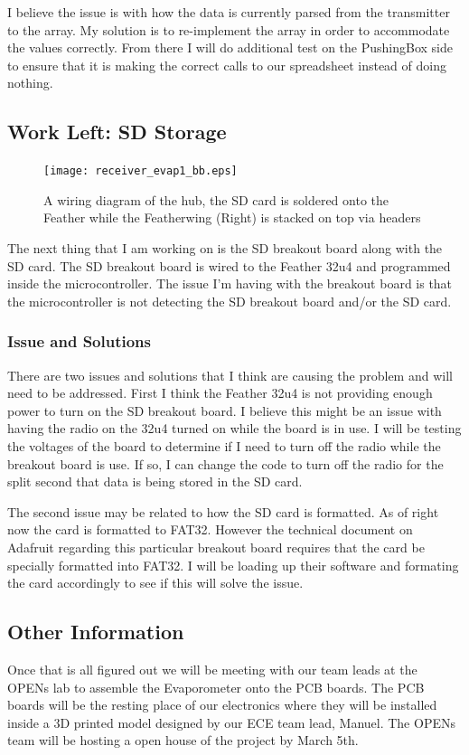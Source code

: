 \documentclass[onecolumn, draftclsnofoot,10pt, compsoc]{IEEEtran}
\begin{document}
I believe the issue is with how the data is currently parsed from the transmitter to the array.  My solution is to re-implement the array in order to accommodate the values correctly.  From there I will do additional test on the PushingBox side to ensure that it is making the correct calls to our spreadsheet instead of doing nothing.\\

\subsection{Work Left: SD Storage}
\begin{figure}[ht]
\caption{A wiring diagram of the hub, the SD card is soldered onto the Feather while the Featherwing (Right) is stacked on top via headers}
\centering
\texttt{[image: receiver\_evap1\_bb.eps]}
\end{figure}

The next thing that I am working on is the SD breakout board along with the SD card.  The SD breakout board is wired to the Feather 32u4 and programmed inside the microcontroller.  The issue I'm having with the breakout board is that the microcontroller is not detecting the SD breakout board and/or the SD card.  

\subsubsection{Issue and Solutions}
There are two issues and solutions that I think are causing the problem and will need to be addressed.  First I think the Feather 32u4 is not providing enough power to turn on the SD breakout board.  I believe this might be an issue with having the radio on the 32u4 turned on while the board is in use.  I will be testing the voltages of the board to determine if I need to turn off the radio while the breakout board is use.  If so, I can change the code to turn off the radio for the split second that data is being stored in the SD card.

The second issue may be related to how the SD card is formatted.  As of right now the card is formatted to FAT32.  However the technical document on Adafruit regarding this particular breakout board requires that the card be specially formatted into FAT32.  I will be loading up their software and formating the card accordingly to see if this will solve the issue.\\

\subsection{Other Information}
Once that is all figured out we will be meeting with our team leads at the OPENs lab to assemble the Evaporometer onto the PCB boards.  The PCB boards will be the resting place of our electronics where they will be installed inside a 3D printed model designed by our ECE team lead, Manuel.  The OPENs team will be hosting a open house of the project by March 5th.
\end{document}
